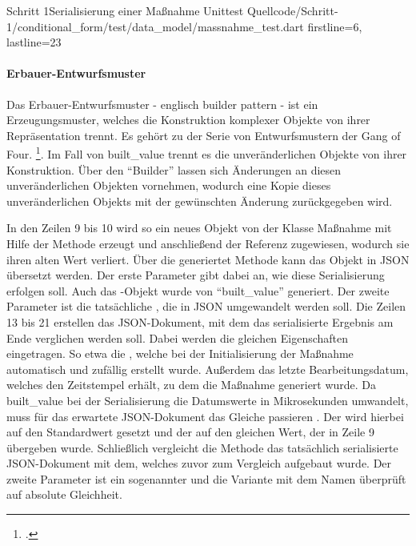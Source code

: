 \begin{alexlisting}{Schritt 1}{Serialisierung einer Maßnahme Unittest}
  {Quellcode/Schritt-1/conditional_form/test/data_model/massnahme_test.dart}
  {firstline=6, lastline=23}
  \label{lst:SerialisierungEinerMassnahmeUnittest}
\end{alexlisting}

\paragraph{Erbauer-Entwurfsmuster} Das Erbauer-Entwurfsmuster - englisch builder pattern - ist ein Erzeugungsmuster, welches die Konstruktion komplexer Objekte von ihrer Repräsentation trennt.
Es gehört zu der Serie von Entwurfsmustern der Gang of Four. \footcite[Vgl.][S. 119]{gamma2009entwurfsmuster}. Im Fall von built_value trennt es die unveränderlichen Objekte von ihrer Konstruktion. Über den \enquote{Builder} lassen sich Änderungen an diesen unveränderlichen Objekten vornehmen, wodurch eine Kopie dieses unveränderlichen Objekts mit der gewünschten Änderung zurückgegeben wird.

In den Zeilen 9 bis 10 wird so ein neues Objekt von der Klasse Maßnahme mit Hilfe der Methode  erzeugt und anschließend der Referenz  zugewiesen, wodurch sie ihren alten Wert verliert.
Über die generiertet Methode   kann das Objekt in JSON übersetzt werden.
Der erste Parameter  gibt dabei an, wie diese Serialisierung erfolgen soll. Auch das -Objekt wurde von \enquote{built_value} generiert.
Der zweite Parameter ist die tatsächliche , die in JSON umgewandelt werden soll.
Die Zeilen 13 bis 21 erstellen das JSON-Dokument, mit dem das serialisierte Ergebnis am Ende verglichen werden soll. Dabei werden die gleichen Eigenschaften eingetragen.
So etwa die , welche bei der Initialisierung der Maßnahme automatisch und zufällig erstellt wurde. Außerdem das letzte Bearbeitungsdatum, welches den Zeitstempel erhält, zu dem die Maßnahme generiert wurde.
Da built_value bei der Serialisierung die Datumswerte in Mikrosekunden umwandelt, muss für das erwartete JSON-Dokument das Gleiche passieren .
Der   wird hierbei auf den Standardwert  gesetzt und der   auf den gleichen Wert, der in Zeile 9 übergeben wurde.
Schließlich vergleicht die Methode  das tatsächlich serialisierte JSON-Dokument mit dem, welches zuvor zum Vergleich aufgebaut wurde.
Der zweite Parameter ist ein sogenannter  und die Variante mit dem Namen  überprüft auf absolute Gleichheit.



